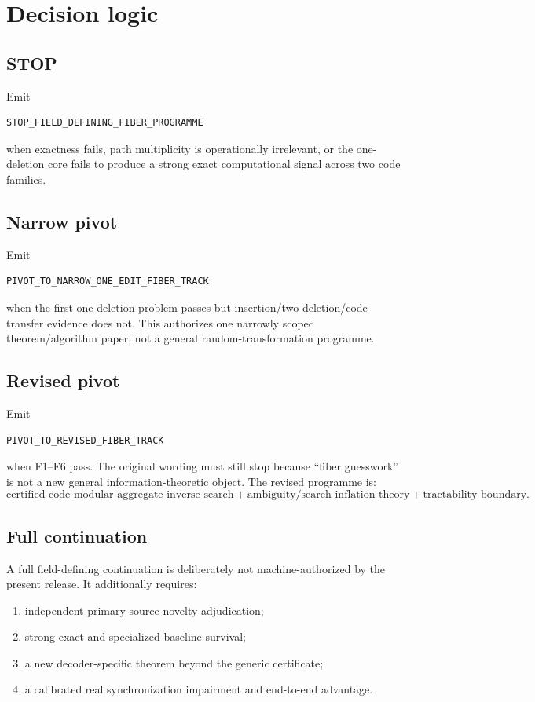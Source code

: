 \documentclass[11pt]{article}
\begin{document}
\section{Decision logic}

\subsection{STOP}
Emit
\begin{lstlisting}[basicstyle=\ttfamily\small]
STOP_FIELD_DEFINING_FIBER_PROGRAMME
\end{lstlisting}
when exactness fails, path multiplicity is operationally irrelevant, or the one-deletion core fails to produce a strong exact computational signal across two code families.

\subsection{Narrow pivot}
Emit
\begin{lstlisting}[basicstyle=\ttfamily\small]
PIVOT_TO_NARROW_ONE_EDIT_FIBER_TRACK
\end{lstlisting}
when the first one-deletion problem passes but insertion/two-deletion/code-transfer evidence does not. This authorizes one narrowly scoped theorem/algorithm paper, not a general random-transformation programme.

\subsection{Revised pivot}
Emit
\begin{lstlisting}[basicstyle=\ttfamily\small]
PIVOT_TO_REVISED_FIBER_TRACK
\end{lstlisting}
when F1--F6 pass. The original wording must still stop because ``fiber guesswork'' is not a new general information-theoretic object. The revised programme is:
\begin{equation}
\boxed{\text{certified code-modular aggregate inverse search} + \text{ambiguity/search-inflation theory} + \text{tractability boundary}.}
\end{equation}

\subsection{Full continuation}
A full field-defining continuation is deliberately not machine-authorized by the present release. It additionally requires:
\begin{enumerate}
\item independent primary-source novelty adjudication;
\item strong exact and specialized baseline survival;
\item a new decoder-specific theorem beyond the generic certificate;
\item a calibrated real synchronization impairment and end-to-end advantage.
\end{enumerate}
\end{document}
